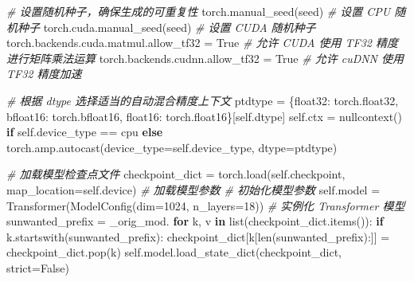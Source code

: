 \documentclass[
]{article}
\newenvironment{Shaded}{}{}
\newcommand{\BuiltInTok}[1]{\textcolor[rgb]{0.00,0.50,0.00}{#1}}
\newcommand{\CommentTok}[1]{\textcolor[rgb]{0.38,0.63,0.69}{\textit{#1}}}
\newcommand{\ControlFlowTok}[1]{\textcolor[rgb]{0.00,0.44,0.13}{\textbf{#1}}}
\newcommand{\DecValTok}[1]{\textcolor[rgb]{0.25,0.63,0.44}{#1}}
\newcommand{\KeywordTok}[1]{\textcolor[rgb]{0.00,0.44,0.13}{\textbf{#1}}}
\newcommand{\NormalTok}[1]{#1}
\newcommand{\OperatorTok}[1]{\textcolor[rgb]{0.40,0.40,0.40}{#1}}
\newcommand{\StringTok}[1]{\textcolor[rgb]{0.25,0.44,0.63}{#1}}
\newcommand{\VariableTok}[1]{\textcolor[rgb]{0.10,0.09,0.49}{#1}}
\begin{document}
\begin{Shaded}
\begin{Highlighting}[]
        \CommentTok{\# 设置随机种子，确保生成的可重复性}
\NormalTok{        torch.manual\_seed(seed)  }\CommentTok{\# 设置 CPU 随机种子}
\NormalTok{        torch.cuda.manual\_seed(seed)  }\CommentTok{\# 设置 CUDA 随机种子}
\NormalTok{        torch.backends.cuda.matmul.allow\_tf32 }\OperatorTok{=} \VariableTok{True}  \CommentTok{\# 允许 CUDA 使用 TF32 精度进行矩阵乘法运算}
\NormalTok{        torch.backends.cudnn.allow\_tf32 }\OperatorTok{=} \VariableTok{True}  \CommentTok{\# 允许 cuDNN 使用 TF32 精度加速}
        
        \CommentTok{\# 根据 dtype 选择适当的自动混合精度上下文}
\NormalTok{        ptdtype }\OperatorTok{=}\NormalTok{ \{}\StringTok{\textquotesingle{}float32\textquotesingle{}}\NormalTok{: torch.float32, }\StringTok{\textquotesingle{}bfloat16\textquotesingle{}}\NormalTok{: torch.bfloat16, }\StringTok{\textquotesingle{}float16\textquotesingle{}}\NormalTok{: torch.float16\}[}\VariableTok{self}\NormalTok{.dtype]}
        \VariableTok{self}\NormalTok{.ctx }\OperatorTok{=}\NormalTok{ nullcontext() }\ControlFlowTok{if} \VariableTok{self}\NormalTok{.device\_type }\OperatorTok{==} \StringTok{\textquotesingle{}cpu\textquotesingle{}} \ControlFlowTok{else}\NormalTok{ torch.amp.autocast(device\_type}\OperatorTok{=}\VariableTok{self}\NormalTok{.device\_type, dtype}\OperatorTok{=}\NormalTok{ptdtype)}
        
        \CommentTok{\# 加载模型检查点文件}
\NormalTok{        checkpoint\_dict }\OperatorTok{=}\NormalTok{ torch.load(}\VariableTok{self}\NormalTok{.checkpoint, map\_location}\OperatorTok{=}\VariableTok{self}\NormalTok{.device)  }\CommentTok{\# 加载模型参数 \# 初始化模型参数}
        \VariableTok{self}\NormalTok{.model }\OperatorTok{=}\NormalTok{ Transformer(ModelConfig(dim}\OperatorTok{=}\DecValTok{1024}\NormalTok{, n\_layers}\OperatorTok{=}\DecValTok{18}\NormalTok{))  }\CommentTok{\# 实例化 Transformer 模型}
\NormalTok{        sunwanted\_prefix }\OperatorTok{=} \StringTok{\textquotesingle{}\_orig\_mod.\textquotesingle{}}
        \ControlFlowTok{for}\NormalTok{ k, v }\KeywordTok{in} \BuiltInTok{list}\NormalTok{(checkpoint\_dict.items()):}
            \ControlFlowTok{if}\NormalTok{ k.startswith(sunwanted\_prefix):}
\NormalTok{                checkpoint\_dict[k[}\BuiltInTok{len}\NormalTok{(sunwanted\_prefix):]] }\OperatorTok{=}\NormalTok{ checkpoint\_dict.pop(k)}
        \VariableTok{self}\NormalTok{.model.load\_state\_dict(checkpoint\_dict, strict}\OperatorTok{=}\VariableTok{False}\NormalTok{)}
        

\end{Highlighting}
\end{Shaded}
\end{document}
